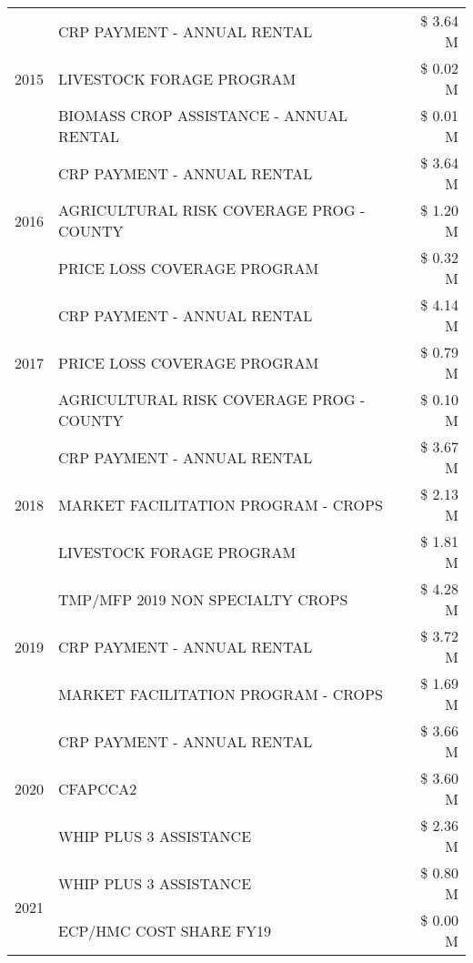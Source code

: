 \begin{tabular}{llr}
\cline{1-3}
\multirow[t]{3}{*}{2015} & CRP PAYMENT - ANNUAL RENTAL & \$ 3.64 M \\
 & LIVESTOCK FORAGE PROGRAM & \$ 0.02 M \\
 & BIOMASS CROP ASSISTANCE - ANNUAL RENTAL & \$ 0.01 M \\
\cline{1-3}
\multirow[t]{3}{*}{2016} & CRP PAYMENT - ANNUAL RENTAL & \$ 3.64 M \\
 & AGRICULTURAL RISK COVERAGE PROG - COUNTY & \$ 1.20 M \\
 & PRICE LOSS COVERAGE PROGRAM & \$ 0.32 M \\
\cline{1-3}
\multirow[t]{3}{*}{2017} & CRP PAYMENT - ANNUAL RENTAL & \$ 4.14 M \\
 & PRICE LOSS COVERAGE PROGRAM & \$ 0.79 M \\
 & AGRICULTURAL RISK COVERAGE PROG - COUNTY & \$ 0.10 M \\
\cline{1-3}
\multirow[t]{3}{*}{2018} & CRP PAYMENT - ANNUAL RENTAL & \$ 3.67 M \\
 & MARKET FACILITATION PROGRAM - CROPS & \$ 2.13 M \\
 & LIVESTOCK FORAGE PROGRAM & \$ 1.81 M \\
\cline{1-3}
\multirow[t]{3}{*}{2019} & TMP/MFP 2019 NON SPECIALTY CROPS & \$ 4.28 M \\
 & CRP PAYMENT - ANNUAL RENTAL & \$ 3.72 M \\
 & MARKET FACILITATION PROGRAM - CROPS & \$ 1.69 M \\
\cline{1-3}
\multirow[t]{3}{*}{2020} & CRP PAYMENT - ANNUAL RENTAL & \$ 3.66 M \\
 & CFAPCCA2 & \$ 3.60 M \\
 & WHIP PLUS 3 ASSISTANCE & \$ 2.36 M \\
\cline{1-3}
\multirow[t]{2}{*}{2021} & WHIP PLUS 3 ASSISTANCE & \$ 0.80 M \\
 & ECP/HMC COST SHARE FY19 & \$ 0.00 M \\
\cline{1-3}
\bottomrule
\end{tabular}
